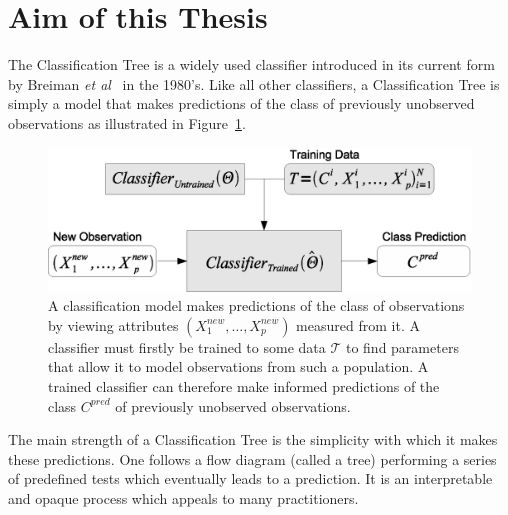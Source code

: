 \section{Aim of this Thesis}
\label{AimofthisThesis}
The Classification Tree is a widely used classifier introduced in its current form by Breiman \emph{et al}~\cite{cart84-2} in the 1980's. Like all other classifiers, a Classification Tree is simply a model that makes predictions of the class of previously unobserved observations as illustrated in Figure~\ref{fig_typical_classifier}. \\
\begin{figure}
\centering
\includegraphics[width=1\textwidth]{fig_typical_classifier.eps}
\caption{A classification model makes predictions of the class of observations by viewing attributes $\left(X_1^{new},\ldots,X_p^{new}\right)$ measured from it. A classifier must firstly be trained to some data $\mathcal{T}$ to find parameters that allow it to model observations from such a population. A trained classifier can therefore make informed predictions of the class $C^{pred}$ of previously unobserved observations.}
\label{fig_typical_classifier}
\end{figure}

The main strength of a Classification Tree is the simplicity with which it makes these predictions. One follows a flow diagram (called a tree) performing a series of predefined tests which eventually leads to a prediction. It is an interpretable and opaque process which appeals to many practitioners.\\

